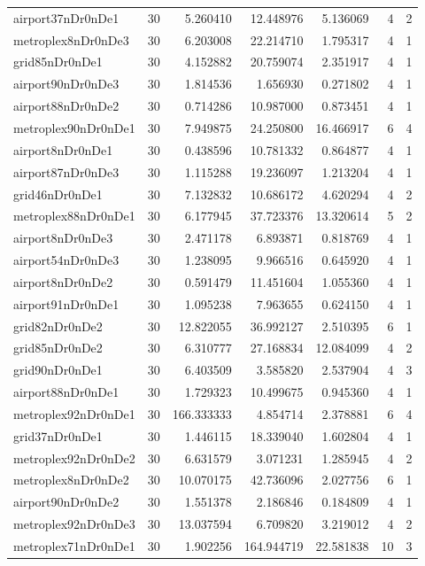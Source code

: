 \begin{longtable}{|l|r|r|r|r|r|r|}
airport37nDr0nDe1 & 30 & 5.260410 & 12.448976 & 5.136069 & 4 & 2 \\
metroplex8nDr0nDe3 & 30 & 6.203008 & 22.214710 & 1.795317 & 4 & 1 \\
grid85nDr0nDe1 & 30 & 4.152882 & 20.759074 & 2.351917 & 4 & 1 \\
airport90nDr0nDe3 & 30 & 1.814536 & 1.656930 & 0.271802 & 4 & 1 \\
airport88nDr0nDe2 & 30 & 0.714286 & 10.987000 & 0.873451 & 4 & 1 \\
metroplex90nDr0nDe1 & 30 & 7.949875 & 24.250800 & 16.466917 & 6 & 4 \\
airport8nDr0nDe1 & 30 & 0.438596 & 10.781332 & 0.864877 & 4 & 1 \\
airport87nDr0nDe3 & 30 & 1.115288 & 19.236097 & 1.213204 & 4 & 1 \\
grid46nDr0nDe1 & 30 & 7.132832 & 10.686172 & 4.620294 & 4 & 2 \\
metroplex88nDr0nDe1 & 30 & 6.177945 & 37.723376 & 13.320614 & 5 & 2 \\
airport8nDr0nDe3 & 30 & 2.471178 & 6.893871 & 0.818769 & 4 & 1 \\
airport54nDr0nDe3 & 30 & 1.238095 & 9.966516 & 0.645920 & 4 & 1 \\
airport8nDr0nDe2 & 30 & 0.591479 & 11.451604 & 1.055360 & 4 & 1 \\
airport91nDr0nDe1 & 30 & 1.095238 & 7.963655 & 0.624150 & 4 & 1 \\
grid82nDr0nDe2 & 30 & 12.822055 & 36.992127 & 2.510395 & 6 & 1 \\
grid85nDr0nDe2 & 30 & 6.310777 & 27.168834 & 12.084099 & 4 & 2 \\
grid90nDr0nDe1 & 30 & 6.403509 & 3.585820 & 2.537904 & 4 & 3 \\
airport88nDr0nDe1 & 30 & 1.729323 & 10.499675 & 0.945360 & 4 & 1 \\
metroplex92nDr0nDe1 & 30 & 166.333333 & 4.854714 & 2.378881 & 6 & 4 \\
grid37nDr0nDe1 & 30 & 1.446115 & 18.339040 & 1.602804 & 4 & 1 \\
metroplex92nDr0nDe2 & 30 & 6.631579 & 3.071231 & 1.285945 & 4 & 2 \\
metroplex8nDr0nDe2 & 30 & 10.070175 & 42.736096 & 2.027756 & 6 & 1 \\
airport90nDr0nDe2 & 30 & 1.551378 & 2.186846 & 0.184809 & 4 & 1 \\
metroplex92nDr0nDe3 & 30 & 13.037594 & 6.709820 & 3.219012 & 4 & 2 \\
metroplex71nDr0nDe1 & 30 & 1.902256 & 164.944719 & 22.581838 & 10 & 3 \\

\end{longtable}
